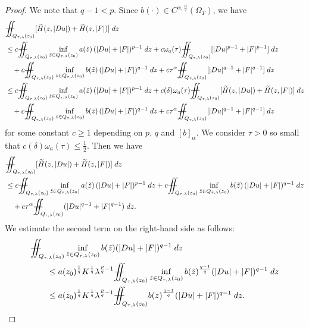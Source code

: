 \documentclass[11pt,oneside, english,reqno,twoside a4paper]{amsart}
\theoremstyle{definition}
\numberwithin{theorem}{section}
\numberwithin{equation}{section}
\newcommand{\iintss}{{\int\hspace{-0.28cm}\int}}
\newcommand{ \miints }{{\iintss\hspace{-0.56cm} -\hspace{-0.15cm}-}}
\newcommand{\miint}[1]{{\miints_{\hspace{-0.13cm}#1}}}
\begin{document}
\begin{proof}
We note that $q-1<p$. Since $b(\cdot)\in C^{\alpha,\frac{\alpha}{2}}(\Omega_T)$, we have
\begin{align*}
&\miint{Q_{\tau,\lambda}(z_0)}[\widetilde{H}(z,|Du|)+\widetilde{H}(z,|F|)]\;dz \\
&\leq c\miint{Q_{\tau,\lambda}(z_0)} \inf_{\tilde{z}\in Q_{\tau,\lambda}(z_0)}a(\tilde{z}) \, (|Du|+|F|)^{p-1} \; dz+c \omega_a(\tau) \miint{Q_{\tau,\lambda}(z_0)} [|Du|^{p-1}+|F|^{p-1}] \; dz\\
&\quad +c\miint{Q_{\tau,\lambda}(z_0)}\inf_{\tilde{z}\in Q_{\tau,\lambda}(z_0)}b(\tilde{z}) \, (|Du|+|F|)^{q-1}\;dz+c\tau^\alpha \miint{Q_{\tau,\lambda}(z_0)} [|Du|^{q-1}+|F|^{q-1}] \; dz\\
& \leq c\miint{Q_{\tau,\lambda}(z_0)} \inf_{\tilde{z}\in Q_{\tau,\lambda}(z_0)}a(\tilde{z}) \, (|Du|+|F|)^{p-1} \; dz+c (\delta) \omega_a(\tau) \miint{Q_{\tau,\lambda}(z_0)} [\widetilde{H}(z,|Du|)+\widetilde{H}(z,|F|)] \; dz\\
&\quad +c\miint{Q_{\tau,\lambda}(z_0)}\inf_{\tilde{z}\in Q_{\tau,\lambda}(z_0)}b(\tilde{z}) \, (|Du|+|F|)^{q-1}\;dz+c\tau^\alpha \miint{Q_{\tau,\lambda}(z_0)} [|Du|^{q-1}+|F|^{q-1}] \; dz
\end{align*}
for some constant $c \geq 1$ depending on $p$, $q$ and $[b]_\alpha$.
We consider $\tau>0$ so small that $\displaystyle c (\delta) \omega_a(\tau) \leq \frac{1}{2}$. Then we have
\begin{align*}
&\miint{Q_{\tau,\lambda}(z_0)}[\widetilde{H}(z,|Du|)+\widetilde{H}(z,|F|)]\;dz\\
&\leq c\miint{Q_{\tau,\lambda}(z_0)} \inf_{\tilde{z}\in Q_{\tau,\lambda}(z_0)}a(\tilde{z}) \, (|Du|+|F|)^{p-1} \; dz+c\miint{Q_{\tau,\lambda}(z_0)}\inf_{\tilde{z}\in Q_{\tau,\lambda}(z_0)}b(\tilde{z}) \, (|Du|+|F|)^{q-1}\;dz\\
&\quad +c\tau^\alpha \miint{Q_{\tau,\lambda}(z_0)} (|Du|^{q-1}+|F|^{q-1}) \; dz.
\end{align*}
We estimate the second term on the right-hand side as follows:
    \begin{align*}
        &\miint{Q_{\tau,\lambda}(z_0)}\inf_{\tilde{z}\in Q_{\tau,\lambda}(z_0)} b(\tilde{z})(|Du|+|F|)^{q-1} \; dz \\
        &\qquad\leq a(z_0)^{\frac{1}{q}} K^{\frac{1}{q}}\lambda^{\frac{p}{q}-1}\miint{Q_{\tau,\lambda}(z_0)} \inf_{\tilde{z}\in Q_{\tau,\lambda}(z_0)}b(\tilde{z})^{\frac{q-1}{q}} (|Du|+|F|)^{q-1}\; dz\\
        &\qquad \leq a(z_0)^{\frac{1}{q}} K^{\frac{1}{q}}\lambda^{\frac{p}{q}-1}\miint{Q_{\tau,\lambda}(z_0)} b(z)^{\frac{q-1}{q}} (|Du|+|F|)^{q-1}\; dz.

\end{align*}
\end{proof}
\end{document}
